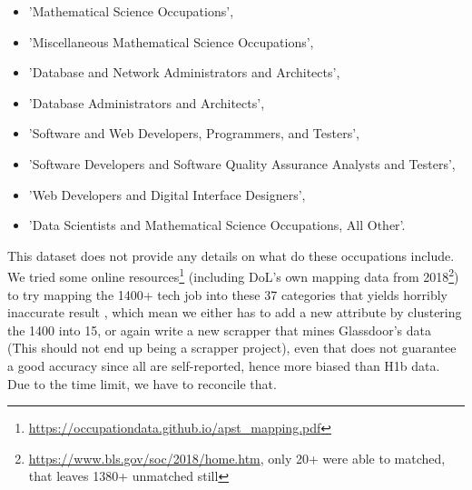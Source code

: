{\begin{itemize}
		\item	'Mathematical Science Occupations',
		\item	'Miscellaneous Mathematical Science Occupations',
		\item	'Database and Network Administrators and Architects',
		\item	'Database Administrators and Architects',
		\item	'Software and Web Developers, Programmers, and Testers',
		\item	'Software Developers and Software Quality Assurance Analysts and Testers',
		\item	'Web Developers and Digital Interface Designers',
		\item	'Data Scientists and Mathematical Science Occupations, All Other'.
	\end{itemize}
}

This dataset does not provide any details on what do these occupations include. We tried some online resources\footnote{\url{https://occupationdata.github.io/apst_mapping.pdf}} (including DoL's own mapping data from 2018\footnote{\url{https://www.bls.gov/soc/2018/home.htm}, only 20+ were able to  matched, that leaves 1380+ unmatched still }) to try mapping the 1400+ tech job into these 37 categories that yields horribly inaccurate result , which mean we either has to add a new attribute by clustering the 1400 into 15, or again write a new scrapper that mines Glassdoor's data (This should not end up being a scrapper project), even that does not guarantee a good  accuracy since all are self-reported, hence  more biased than H1b data. Due to the time limit, we have to reconcile that. 
